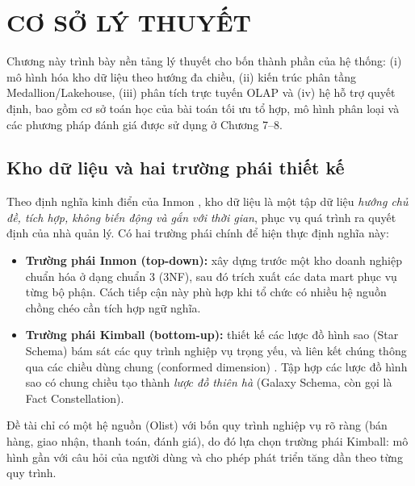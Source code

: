 \section{CƠ SỞ LÝ THUYẾT}
\suppressfloats[t]

Chương này trình bày nền tảng lý thuyết cho bốn thành phần của hệ thống: (i) mô hình hóa kho dữ liệu theo hướng đa chiều, (ii) kiến trúc phân tầng Medallion/Lakehouse, (iii) phân tích trực tuyến OLAP và (iv) hệ hỗ trợ quyết định, bao gồm cơ sở toán học của bài toán tối ưu tổ hợp, mô hình phân loại và các phương pháp đánh giá được sử dụng ở Chương 7--8.

\subsection{Kho dữ liệu và hai trường phái thiết kế}
Theo định nghĩa kinh điển của Inmon \cite{inmon2005}, kho dữ liệu là một tập dữ liệu \emph{hướng chủ đề, tích hợp, không biến động và gắn với thời gian}, phục vụ quá trình ra quyết định của nhà quản lý. Có hai trường phái chính để hiện thực định nghĩa này:
\begin{itemize}
    \item \textbf{Trường phái Inmon (top-down):} xây dựng trước một kho doanh nghiệp chuẩn hóa ở dạng chuẩn 3 (3NF), sau đó trích xuất các data mart phục vụ từng bộ phận. Cách tiếp cận này phù hợp khi tổ chức có nhiều hệ nguồn chồng chéo cần tích hợp ngữ nghĩa.
    \item \textbf{Trường phái Kimball (bottom-up):} thiết kế các lược đồ hình sao (Star Schema) bám sát các quy trình nghiệp vụ trọng yếu, và liên kết chúng thông qua các chiều dùng chung (conformed dimension) \cite{kimball2013}. Tập hợp các lược đồ hình sao có chung chiều tạo thành \emph{lược đồ thiên hà} (Galaxy Schema, còn gọi là Fact Constellation).
\end{itemize}
Đề tài chỉ có một hệ nguồn (Olist) với bốn quy trình nghiệp vụ rõ ràng (bán hàng, giao nhận, thanh toán, đánh giá), do đó lựa chọn trường phái Kimball: mô hình gần với câu hỏi của người dùng và cho phép phát triển tăng dần theo từng quy trình.

